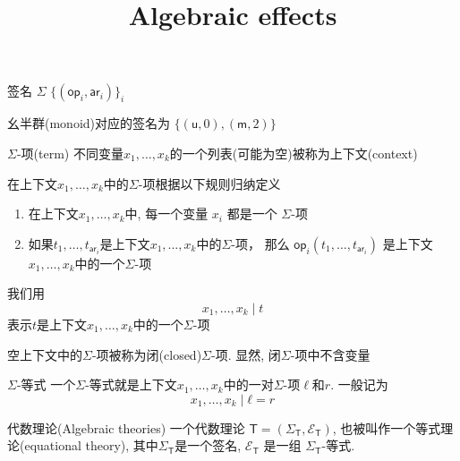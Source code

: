 \documentclass{beamer}
\title{Algebraic effects}
\date{}
\newcommand{\theory}[1]{\mathsf{#1}} %
\newcommand{\signature}[1]{\Sigma_{\theory{#1}}} %
\newcommand{\equations}[1]{\mathcal{E}_{\theory{#1}}} %
\newcommand{\family}[2]{\{#1\}_{#2}} %
\newcommand{\op}[1]{\mathsf{op}_{#1}} %
\newcommand{\arity}[1]{\mathsf{ar}_{#1}} %
\begin{document}
\begin{frame}
    \titlepage
\end{frame}

\begin{frame}{签名 $\Sigma$}
  $\family{(\op{i}, \arity{i})}{i}$

  \vspace{6mm}

  幺半群(monoid)对应的签名为 $\{(\mathsf{u}, 0), (\mathsf{m}, 2)\}$
\end{frame}

\begin{frame}{$\Sigma$-项(term)}
 不同变量$x_1, …, x_k$的一个列表(可能为空)被称为上下文(context)

 \vspace{6mm}

 在上下文$x_1, …, x_k$中的$\Sigma$-项根据以下规则归纳定义
 \begin{enumerate}
  \item 在上下文$x_1, …, x_k$中, 每一个变量 $x_i$ 都是一个 $\Sigma$-项
  \item 如果$t_1, …, t_{\arity{i}}$是上下文$x_1, …, x_k$中的$\Sigma$-项， 那么 $\op{i}(t_1, …, t_{\arity{i}})$ 是上下文 $x_1, …, x_k$中的一个$\Sigma$-项
 \end{enumerate}

 \vspace{6mm}

 我们用
 \begin{equation*}
  x_1, …, x_k ∣ t
\end{equation*}
表示$t$是上下文$x_1, …, x_k$中的一个$\Sigma$-项

\vspace{6mm}

空上下文中的$\Sigma$-项被称为闭(closed)$\Sigma$-项. 显然, 闭$\Sigma$-项中不含变量
\end{frame}

\begin{frame}{$\Sigma$-等式}
  一个$\Sigma$-等式就是上下文$x_1, …, x_k$中的一对$\Sigma$-项$\ell$和$r$. 一般记为
\begin{equation*}
  x_1, …, x_k ∣ ℓ = r
\end{equation*}
\end{frame}

\begin{frame}{代数理论(Algebraic theories)}
  一个代数理论 $\theory{T} = (\signature{T}, \equations{T})$, 也被叫作一个等式理论(equational theory), 其中$\signature{T}$是一个签名, $\equations{T}$ 是一组 $\signature{T}$-等式.
\end{frame}
\end{document}
